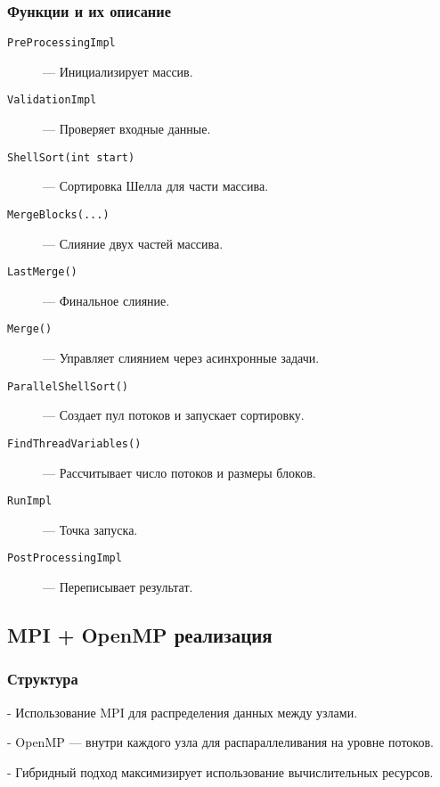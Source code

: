\documentclass[12pt]{article}
\begin{document}
\subsubsection*{Функции и их описание}
\begin{description}
    \item[\texttt{PreProcessingImpl}] — Инициализирует массив.
    \item[\texttt{ValidationImpl}] — Проверяет входные данные.
    \item[\texttt{ShellSort(int start)}] — Сортировка Шелла для части массива.
    \item[\texttt{MergeBlocks(...)}] — Слияние двух частей массива.
    \item[\texttt{LastMerge()}] — Финальное слияние.
    \item[\texttt{Merge()}] — Управляет слиянием через асинхронные задачи.
    \item[\texttt{ParallelShellSort()}] — Создает пул потоков и запускает сортировку.
    \item[\texttt{FindThreadVariables()}] — Рассчитывает число потоков и размеры блоков.
    \item[\texttt{RunImpl}] — Точка запуска.
    \item[\texttt{PostProcessingImpl}] — Переписывает результат.
\end{description}

\subsection{MPI + OpenMP реализация}
\subsubsection*{Структура}

    
- Использование MPI для распределения данных между узлами.
    
- OpenMP — внутри каждого узла для распараллеливания на уровне потоков.
    
- Гибридный подход максимизирует использование вычислительных ресурсов.
\end{document}
